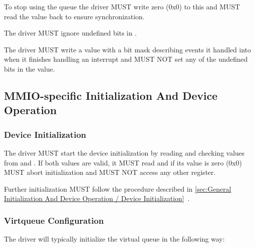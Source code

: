 To stop using the queue the driver MUST write zero (0x0) to this
 and MUST read the value back to ensure
synchronization.

The driver MUST ignore undefined bits in .

The driver MUST write a value with a bit mask describing events it handled into  when
it finishes handling an interrupt and MUST NOT set any of the undefined bits in the value.

\subsection{MMIO-specific Initialization And Device Operation}\label{sec:Virtio Transport Options / Virtio Over MMIO / MMIO-specific Initialization And Device Operation}

\subsubsection{Device Initialization}\label{sec:Virtio Transport Options / Virtio Over MMIO / MMIO-specific Initialization And Device Operation / Device Initialization}


The driver MUST start the device initialization by reading and
checking values from  and .
If both values are valid, it MUST read 
and if its value is zero (0x0) MUST abort initialization and
MUST NOT access any other register.

Further initialization MUST follow the procedure described in
\ref{sec:General Initialization And Device Operation / Device Initialization}~.

\subsubsection{Virtqueue Configuration}\label{sec:Virtio Transport Options / Virtio Over MMIO / MMIO-specific Initialization And Device Operation / Virtqueue Configuration}

The driver will typically initialize the virtual queue in the following way:

